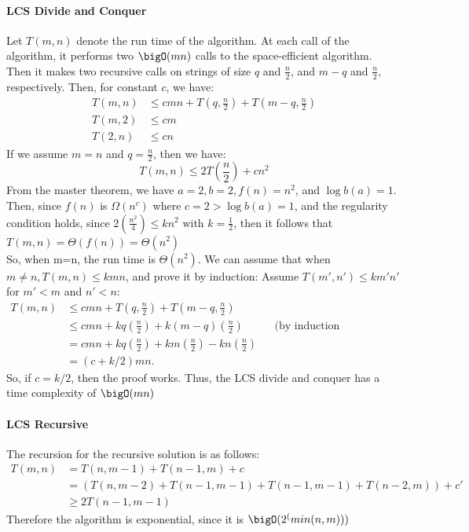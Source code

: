 	\paragraph{LCS Divide and Conquer}
		Let $T(m,n)$ denote the run time of the algorithm. At each call of the algorithm, it performs two $\bigO(mn)$ calls to the space-efficient algorithm. \\
		Then it makes two recursive calls on strings of size $q$ and $\frac{n}{2}$, and $m - q$ and $\frac{n}{2}$, respectively. Then, for constant $c$, we have:
		\begin{align*}
			T(m,n) &\leq cmn + T(q,\frac{n}{2}) + T(m-q,\frac{n}{2}) \\
			T(m,2) &\leq cm \\
			T(2,n) &\leq cn
		\end{align*}
		If we assume $m = n$ and $q = \frac{n}{2}$, then we have:
			$$T(m,n) \leq 2T(\frac{n}{2}) + cn^2$$
		From the master theorem, we have $a = 2, b = 2, f(n) = n^2$, and $\log b(a) = 1$. \\
		Then, since $f(n)$ is $\Omega(n^c)$ where $c=2>\log b(a)=1$, and the regularity condition holds, since $2(\frac{n^2}{4}) \leq kn^2$ with $k = \frac{1}{2}$, then it follows that$ T(m,n) = \Theta(f(n)) = \Theta(n^2)$\\
		So, when m=n, the run time is $\Theta(n^2)$. We can assume that when $m \neq n, T(m,n) \leq kmn$, and prove it by induction:
		Assume $T(m',n') \leq km'n'$ for $m'<m$ and $n'<n$:
		\begin{align*}
			T(m, n) &\leq cmn + T(q,\frac{n}{2}) + T(m-q,\frac{n}{2}) \\
				&\leq cmn + kq(\frac{n}{2}) + k(m-q)(\frac{n}{2}) &&\text{(by induction hypothesis)} \\
				&= cmn + kq(\frac{n}{2}) + km(\frac{n}{2}) - kn(\frac{n}{2}) \\
				&= (c+k/2)mn.
		\end{align*}
		So, if $c = k/2$, then the proof works. Thus, the LCS divide and conquer has a time complexity of $\bigO(mn)$

	\paragraph{LCS Recursive}
		The recursion for the recursive solution is as follows:
		\begin{align*}
			T(m,n) &= T(n,m-1) + T(n-1,m) + c \\
				&= (T(n,m-2) + T(n-1,m-1) + T(n-1,m-1) + T(n-2,m)) + c' \\
				&\geq 2T(n-1,m-1)
		\end{align*}
		Therefore the algorithm is exponential, since it is $\bigO(2^(min(n,m)))$

